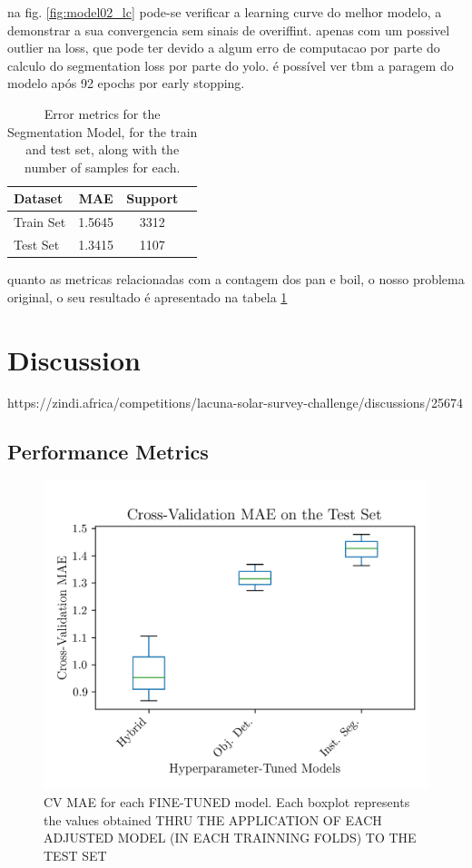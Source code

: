 \documentclass[conference]{IEEEtran}
\begin{document}
na fig. \ref{fig:model02_lc} pode-se verificar a learning curve do melhor modelo, a demonstrar a sua convergencia sem sinais de overiffint. apenas com um possivel outlier na loss, que pode ter devido a algum erro de computacao por parte do calculo do segmentation loss por parte do yolo. é possível ver tbm a paragem do modelo após 92 epochs por early stopping.

\begin{table}[H]
\centering
\caption{Error metrics for the Segmentation Model, for the train and test set, along with the number of samples for each.}
\label{tab:model02_results}
\begin{tabular}{lccc}
\toprule
\textbf{Dataset} & \textbf{MAE} & \textbf{Support} \\
\midrule
Train Set & 1.5645 & 3312 \\
Test Set & 1.3415 & 1107 \\
\bottomrule
\end{tabular}
\end{table}

quanto as metricas relacionadas com a contagem dos pan e boil, o nosso problema original, o seu resultado é apresentado na tabela \ref{tab:model02_results}


\section{Discussion}

https://zindi.africa/competitions/lacuna-solar-survey-challenge/discussions/25674


\subsection{Performance Metrics}

\begin{figure}[H]
    \centering
    \includegraphics[width=1\linewidth]{assets/results_mae_boxplot.png}
    \caption{CV MAE for each FINE-TUNED model. Each boxplot represents the values obtained THRU THE APPLICATION OF EACH ADJUSTED MODEL (IN EACH TRAINNING FOLDS) TO THE TEST SET}
    \label{fig:results_mae_boxplot}
\end{figure}
\end{document}
